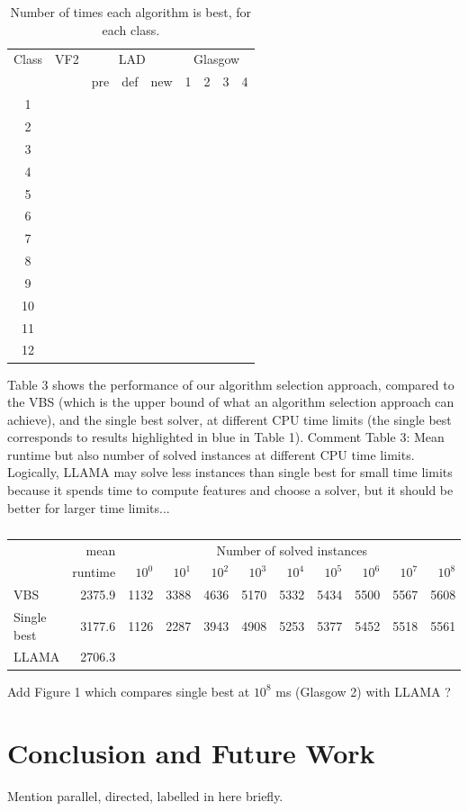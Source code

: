 \documentclass{llncs}
\begin{document}
\begin{table}
\begin{center}
\begin{tabular}{|c||r||r|r|r||r|r|r|r|}
\hline
Class & VF2 & \multicolumn{3}{c||}{LAD} & \multicolumn{4}{c|}{Glasgow}\\
&&pre&def&new&1&2&3&4\\\hline
1\\\hline
2\\\hline
3\\\hline
4\\\hline
5\\\hline
6\\\hline
7\\\hline
8\\\hline
9\\\hline
10\\\hline
11\\\hline
12\\\hline

\end{tabular}
\end{center}
\caption{Number of times each algorithm is best, for each class.\label{expClass}}
\end{table}

Table 3 shows the performance of our algorithm selection approach, compared to the VBS (which is the
upper bound of what an algorithm selection approach can achieve), and the single best solver, at
different CPU time limits (the single best corresponds to results highlighted in blue in Table 1).
Comment Table 3: Mean runtime but also number of solved instances at different CPU time limits.
Logically, LLAMA may solve less instances than single best for small time limits because it spends
time to compute features and choose a solver, but it should be better for larger time limits...

\begin{table}
\begin{tabular}{|l|r|rrrrrrrrr|}
&mean & \multicolumn{9}{c|}{Number of solved instances}\\
&runtime & $10^0$ &  $10^1$ &  $10^2$ &  $10^3$ &  $10^4$ &  $10^5$ &  $10^6$ &  $10^7$ &  $10^8$\\\hline
VBS & 2375.9 & 1132 & 3388 & 4636 & 5170 & 5332 & 5434 & 5500 & 5567 & 5608\\\hline
Single best & 3177.6 & 1126 & 2287 & 3943 & 4908 & 5253 & 5377 & 5452 & 5518 & 5561\\\hline
LLAMA & 2706.3\\\hline
\end{tabular}
\caption{}
\end{table}

Add Figure 1 which compares single best at $10^8$ ms (Glasgow 2) with LLAMA ?

\section{Conclusion and Future Work}

Mention parallel, directed, labelled in here briefly.



\end{document}
